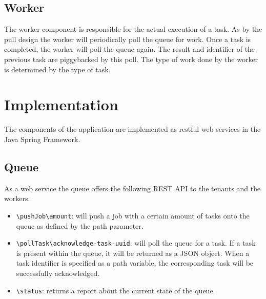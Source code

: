 \subsection{Worker}
The worker component is responsible for the actual execution of a task. As by the pull design the worker will periodically poll the queue for work. Once a task is completed, the worker will poll the queue again. The result and identifier of the previous task are piggybacked by this poll. The type of work done by the worker is determined by the type of task.

\section{Implementation}
The components of the application are implemented as restful web services in the Java Spring Framework. 
\subsection{Queue}
As a web service the queue offers the following REST API to the tenants and the workers. 
\begin{itemize}
    \item \texttt{\textbackslash pushJob\textbackslash amount}: will push a job with a certain amount of tasks onto the queue as defined by the path parameter. 
    \item \texttt{\textbackslash pollTask\textbackslash acknowledge-task-uuid}: will poll the queue for a task. If a task is present within the queue, it will be returned as a JSON object. When a task identifier is specified as a path variable, the corresponding task will be successfully acknowledged. 
    \item \texttt{\textbackslash status}: returns a report about the current state of the queue. 
\end{itemize}


